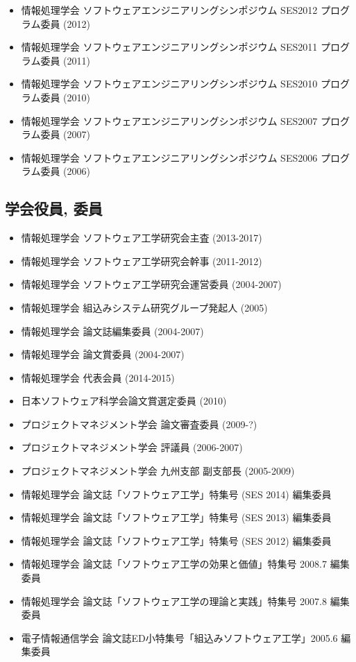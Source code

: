 \documentclass{jarticle}
\begin{document}
\begin{itemize}
\item 情報処理学会 ソフトウェアエンジニアリングシンポジウム SES2012 プログラム委員 (2012)

\item 情報処理学会 ソフトウェアエンジニアリングシンポジウム SES2011 プログラム委員 (2011)

\item 情報処理学会 ソフトウェアエンジニアリングシンポジウム SES2010 プログラム委員 (2010)

\item 情報処理学会 ソフトウェアエンジニアリングシンポジウム SES2007 プログラム委員 (2007)

\item 情報処理学会 ソフトウェアエンジニアリングシンポジウム SES2006 プログラム委員 (2006)
\end{itemize}


\subsection{学会役員, 委員}

\begin{itemize}
\item 情報処理学会 ソフトウェア工学研究会主査 (2013-2017)
\item 情報処理学会 ソフトウェア工学研究会幹事 (2011-2012)
\item 情報処理学会 ソフトウェア工学研究会運営委員 (2004-2007)
\item 情報処理学会 組込みシステム研究グループ発起人 (2005)
\item 情報処理学会 論文誌編集委員 (2004-2007)
\item 情報処理学会 論文賞委員 (2004-2007)
\item 情報処理学会 代表会員 (2014-2015)
\item 日本ソフトウェア科学会論文賞選定委員 (2010)
\item プロジェクトマネジメント学会 論文審査委員 (2009-?)
\item プロジェクトマネジメント学会 評議員 (2006-2007)
\item プロジェクトマネジメント学会 九州支部 副支部長 (2005-2009)
\end{itemize}

\begin{itemize}
\item 情報処理学会 論文誌「ソフトウェア工学」特集号 (SES 2014) 編集委員
\item 情報処理学会 論文誌「ソフトウェア工学」特集号 (SES 2013) 編集委員
\item 情報処理学会 論文誌「ソフトウェア工学」特集号 (SES 2012) 編集委員
\item 情報処理学会 論文誌「ソフトウェア工学の効果と価値」特集号 2008.7 編集委員
\item 情報処理学会 論文誌「ソフトウェア工学の理論と実践」特集号 2007.8 編集委員
\item 電子情報通信学会 論文誌ED小特集号「組込みソフトウェア工学」2005.6 編集委員
\end{itemize}
\end{document}
